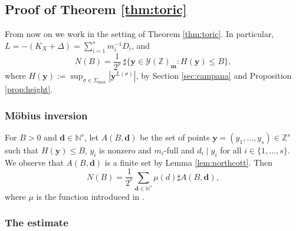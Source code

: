 \documentclass[JEP,XML,SOM,Unicode,published]{cedram}
\newcommand{\bfy}{\boldsymbol{y}}
\newcommand{\bfm}{{\boldsymbol{m}}}
\newcommand{\bfd}{\boldsymbol{d}}
\newcommand\ZZ{\mathbb{Z}}
\newcommand\NN{\mathbb{N}}
\theoremstyle{definition}
\numberwithin{theorem}{section}
\begin{document}
\subsection{Proof of Theorem \ref{thm:toric}}
\label{sec:proof_thmtoric}

From now on we work in the setting of Theorem \ref{thm:toric}.
In particular, $L=-(K_X+\Delta)=\sum_{i=1}^s m_i^{-1}D_i$, and
\[
N(B)=\frac 1{2^r}\ \sharp
\{\bfy\in\mathscr{Y}(\ZZ)_{\bfm}: H(\bfy)\leq B\},
\]
where
$H(\bfy):=\sup_{\sigma\in\Sigma_{\max}} | \bfy^{L(\sigma)}|$,
by Section \ref{sec:campana} and Proposition \ref{prop:height}.

\subsubsection{Möbius inversion}

For $B>0$ and $\bfd\in\NN^{s}$,
let $A(B,\bfd)$ be the set of points
$\bfy=(y_1,\dots,y_s)\in\ZZ^{s}$ such that
$H(\bfy)\leq B$, $y_i$ is nonzero and $m_i$-full and $d_i\mid y_i$ for all $i\in\{1,\dots,s\}$.
We observe that $A(B, \bfd)$ is a finite set by Lemma \ref{lem:northcott}.
Then
\begin{equation}
\label{eq:moebius_inversion}
N(B)=\frac 1{2^r}\sum_{\bfd\in\NN^{s}}\mu(d)\sharp A(B, \bfd),
\end{equation}
where $\mu$ is the function introduced in \cite[Def.\,\& Prop.\,11.9]{MR1679841}.

\subsubsection{The estimate}
\end{document}

